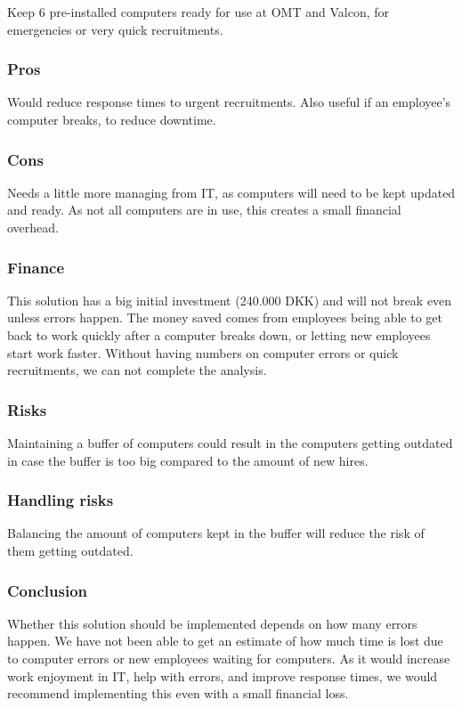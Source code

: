 Keep 6 pre-installed computers ready for use at OMT and Valcon, for emergencies or very quick recruitments.

\subsubsection{Pros} Would reduce response times to urgent recruitments.
Also useful if an employee's computer breaks, to reduce downtime.

\subsubsection{Cons} Needs a little more managing from IT, as
computers will need to be kept updated and ready.
As not all computers are in use, this creates a small financial overhead.

\subsubsection{Finance} 
This solution has a big initial investment (240.000 DKK) and will not break even unless errors happen.
The money saved comes from employees being able to get back to work quickly after a computer breaks down, or letting new employees start work faster.
Without having numbers on computer errors or quick recruitments, we can not complete the analysis.

\subsubsection{Risks}
Maintaining a buffer of computers could result in the computers getting outdated in case the buffer is too big compared to the amount of new hires.

\subsubsection{Handling risks}
Balancing the amount of computers kept in the buffer will reduce the risk of them getting outdated.

\subsubsection{Conclusion}
Whether this solution should be implemented depends on how many errors happen.
We have not been able to get an estimate of how much time is lost due to computer errors or new employees waiting for computers.
As it would increase work enjoyment in IT, help with errors, and improve response times, we would recommend implementing this even with a small financial loss.